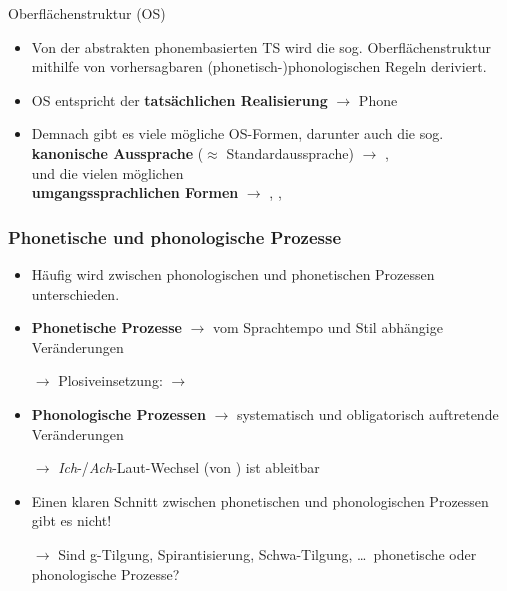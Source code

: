 \begin{frame}{Oberflächenstruktur (OS)}

\begin{itemize}
	\item Von der abstrakten phonembasierten TS wird die sog. Oberflächenstruktur mithilfe von vorhersagbaren (phonetisch-)phonologischen Regeln deriviert.
	\item[]
	\item OS entspricht der \textbf{tatsächlichen Realisierung} $\rightarrow$ Phone \textipa{[ ]}
	\item[]
	\item Demnach gibt es viele mögliche OS-Formen, darunter auch die sog.\\ 
\textbf{kanonische Aussprache} ($\approx$ Standardaussprache) $\rightarrow$ \textipa{[P e: b @ n]},\\
und die vielen möglichen\\
\textbf{umgangssprachlichen Formen} $\rightarrow$ \textipa{[P e: b n]}, \textipa{[P e: b m]}, \textipa{[P e: m]}
\end{itemize}

\end{frame}




\begin{frame}%
\frametitle{Phonetische und phonologische Prozesse}

\begin{itemize}
	\item Häufig wird zwischen phonologischen und phonetischen Prozessen unterschieden.
	\item[]
	\item \textbf{Phonetische Prozesse} $\rightarrow$ vom Sprachtempo und Stil abhängige Veränderungen
	\item[$\rightarrow$] Plosiveinsetzung:  $\rightarrow$ \textipa{[P a m p t]}
	\item[]
	\item \textbf{Phonologische Prozessen} $\rightarrow$ systematisch und obligatorisch auftretende Veränderungen
	\item[$\rightarrow$] \textit{Ich}-/\textit{Ach}-Laut-Wechsel \textipa{[b u: x]} (von ) ist ableitbar
	\item[]
	\item Einen klaren Schnitt zwischen phonetischen und phonologischen Prozessen gibt es nicht!
	\item[$\rightarrow$] Sind g-Tilgung, Spirantisierung, Schwa-Tilgung, \dots\ phonetische oder phonologische Prozesse?
\end{itemize}

\end{frame}



